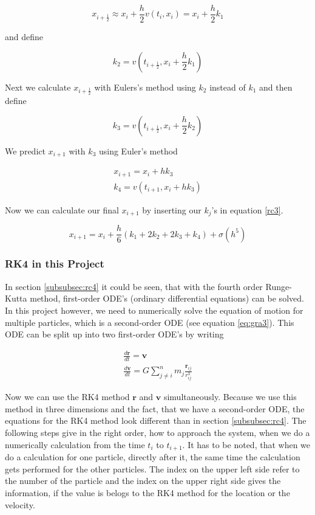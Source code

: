 \documentclass[10pt,a4paper]{article}
\begin{document}
\begin{equation}
\label{s:rc4}
x_{i+\frac{1}{2}} \approx x_i + \frac{h}{2} v(t_i, x_i) = x_i + \frac{h}{2} k_1
\end{equation}

and define

\begin{equation}
\label{rc5}
k_2 = v(t_{i+\frac{1}{2}}, x_i + \frac{h}{2} k_1)
\end{equation}

Next we calculate $x_{i + \frac{1}{2}}$ with Eulers's method using $k_2$ instead of $k_1$ and then define

\begin{equation}
\label{rc6}
k_3 =  v(t_{i+\frac{1}{2}}, x_i+\frac{h}{2} k_2)
\end{equation}

We predict $x_{i+1}$ with $k_3$ using Euler's method

\begin{align}
x_{i+1} = x_i + h k_3 \\
k_4 = v(t_{i+1}, x_i + h k_3)
\end{align}

Now we can calculate our final $x_{i+1}$ by inserting our $k_j$'s in equation \eqref{rc3}.

\begin{equation}
\label{rc9}
x_{i+1} =  x_i + \frac{h}{6} (k_1 + 2 k_2 + 2 k_3 + k_4) + \sigma(h^5)
\end{equation}

\subsubsection{RK4 in this Project}

In section \ref{subsubsec:rc4} it could be seen, that with the fourth order Runge-Kutta method, first-order ODE's (ordinary differential equations) can be solved. In this project however, we need to numerically solve the equation of motion for multiple particles, which is a second-order ODE (see equation \eqref{eq:gra3}). This ODE can be split up into two first-order ODE's by writing

\begin{align}
\frac{d\mathbf{r}}{dt} = \mathbf{v}  \\
\frac{d\mathbf{v}}{dt} = G \sum_{j \neq i}^{n} m_j \frac{\mathbf{r}_{ij}}{r_{ij}^3}
\end{align}

Now we can use the RK4 method $\mathbf{r}$ and $\mathbf{v}$ simultaneously. Because we use this method in three dimensions and the fact, that we have a second-order ODE, the equations for the RK4 method look different than in section \ref{subsubsec:rc4}. The following steps give in the right order, how to approach the system, when we do a numerically calculation from the time $t_i$ to $t_{i+1}$. It has to be noted, that when we do a calculation for one particle, directly after it, the same time the calculation gets performed for the other particles. The index on the upper left side refer to the number of the particle and the index on the upper right side gives the information, if the value is belogs to the RK4 method for the location or the velocity.
\end{document}
